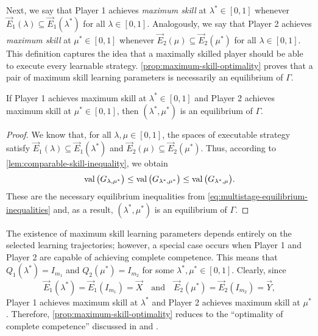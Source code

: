     Next, we say that Player 1 achieves \emph{maximum skill} at $\lambda^* \in [0, 1]$ whenever $\vec{E}_1(\lambda) \subseteq \vec{E}_1(\lambda^*)$ for all $\lambda \in [0, 1]$.
    Analogously, we say that Player 2 achieves \emph{maximum skill} at $\mu^* \in [0, 1]$ whenever $\vec{E}_2(\mu) \subseteq \vec{E}_2(\mu^*)$ for all $\lambda \in [0, 1]$.
    This definition captures the idea that a maximally skilled player should be able to execute every learnable strategy.
    \autoref{prop:maximum-skill-optimality} proves that a pair of maximum skill learning parameters is necessarily an equilibrium of $\Gamma$.

    \begin{proposition} \label{prop:maximum-skill-optimality}
        If Player 1 achieves maximum skill at $\lambda^* \in [0, 1]$ and Player 2 achieves maximum skill at $\mu^* \in [0, 1]$, then $(\lambda^*, \mu^*)$ is an equilibrium of $\Gamma$.
    \end{proposition}

    \begin{proof}
        We know that, for all $\lambda, \mu \in [0, 1]$, the spaces of executable strategy satisfy $\vec{E}_1(\lambda) \subseteq \vec{E}_1(\lambda^*)$ and $\vec{E}_2(\mu) \subseteq \vec{E}_2(\mu^*)$.
        Thus, according to \autoref{lem:comparable-skill-inequality}, we obtain
        \[
            \operatorname{val}\big(G_{\lambda, \mu^*}\big)
                \le \operatorname{val}\big(G_{\lambda^*, \mu^*}\big)
                \le \operatorname{val}\big(G_{\lambda^*, \mu}\big).
        \]
        These are the necessary equilibrium inequalities from \eqref{eq:multistage-equilibrium-inequalities} and, as a result, $(\lambda^*, \mu^*)$ is an equilibrium of $\Gamma$.
    \end{proof}

    The existence of maximum skill learning parameters depends entirely on the selected learning trajectories; however, a special case occurs when Player 1 and Player 2 are capable of achieving complete competence.
    This means that $Q_1(\lambda^*) = I_{m_1}$ and $Q_2(\mu^*) = I_{m_2}$ for some $\lambda^*, \mu^* \in [0, 1]$.
    Clearly, since
    \[
        \vec{E}_1(\lambda^*)
            = \vec{E}_1(I_{m_1})
            = \vec{X}
        \quad\text{and}\quad
        \vec{E}_2(\mu^*)
            = \vec{E}_2(I_{m_2})
            = \vec{Y},
    \]
    Player 1 achieves maximum skill at $\lambda^*$ and Player 2 achieves maximum skill at $\mu^*$.
    Therefore, \autoref{prop:maximum-skill-optimality} reduces to the ``optimality of complete competence'' discussed in \parencite[Section 4.4]{Beck2007} and \parencite[Proposition 3.1]{Beck2013}.
